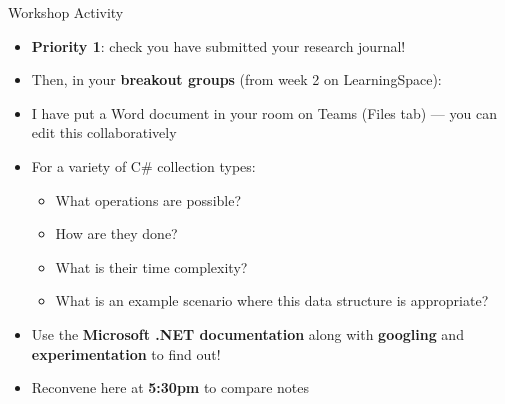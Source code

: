 \begin{frame}{Workshop Activity}
    \begin{itemize}
        \pause\item \textbf{Priority 1}: check you have submitted your research journal!
        \pause\item Then, in your \textbf{breakout groups} (from week 2 on LearningSpace):
        \pause\item I have put a Word document in your room on Teams (Files tab) --- you can edit this collaboratively
        \pause\item For a variety of C\# collection types:
            \begin{itemize}
                \pause\item What operations are possible?
                \pause\item How are they done?
                \pause\item What is their time complexity?
                \pause\item What is an example scenario where this data structure is appropriate?
            \end{itemize}
        \pause\item Use the \textbf{Microsoft .NET documentation} along with \textbf{googling} and \textbf{experimentation} to find out!
        \pause\item Reconvene here at \textbf{5:30pm} to compare notes
    \end{itemize}
\end{frame}

